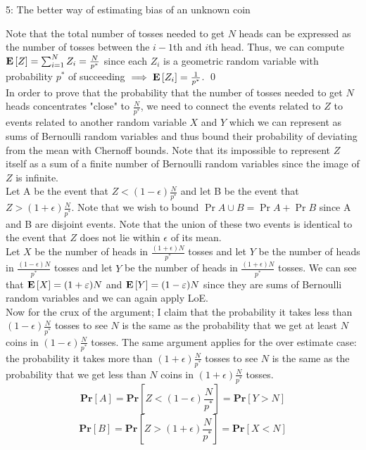 \documentclass[12pt]{article}
\begin{document}
\begin{solution}
\begin{problem}{5: The better way of estimating bias of an unknown coin}
\end{problem}
\begin{solution} 
Note that the total number of tosses needed to get $N$ heads can be expressed as the number of tosses between the $i-1$th and $i$th head. Thus, we can compute $\mathbf{E}\left[Z\right] = \sum_{i=1}^{N}{Z_i} = \frac{N}{p^*}$ since each $Z_i$ is a geometric random variable with probability $p^*$ of succeeding $\implies \mathbf{E}\left[Z_i\right] = \frac{1}{p^*}$. \qed \\
In order to prove that the probability that the number of tosses needed to get $N$ heads concentrates "close" to $\frac{N}{p^*}$, we need to connect the events related to $Z$ to events related to another random variable $X$ and $Y$ which we can represent as sums of Bernoulli random variables and thus bound their probability of deviating from the mean with Chernoff bounds. Note that its impossible to represent $Z$ itself as a sum of a finite number of Bernoulli random variables since the image of $Z$ is infinite. \\

Let A be the event that $Z < (1-\epsilon)\frac{N}{p^*}$ and let B be the event that $Z > (1+\epsilon)\frac{N}{p^*}$. Note that we wish to bound $\Pr{A\cup B} = \Pr{A} + \Pr{B}$ since A and B are disjoint events. Note that the union of these two events is identical to the event that $Z$ does not lie within $\epsilon$ of its mean.\\

Let $X$ be the number of heads in $\frac{(1+ \epsilon)N}{p^*}$ tosses and let $Y$ be the number of heads in $\frac{(1-\epsilon)N}{p^*}$ tosses and let $Y$ be the number of heads in $\frac{(1+ \epsilon)N}{p^*}$ tosses. We can see that $\mathbf{E}\left[X\right] = (1+\varepsilon)N$ and $\mathbf{E}\left[Y\right] = (1-\varepsilon)N$ since they are sums of Bernoulli random variables and we can again apply LoE.\\

Now for the crux of the argument; I claim that the probability it takes less than $(1-\epsilon)\frac{N}{p^*}$ tosses to see $N$ is the same as the probability that we get at least $N$ coins in $(1-\epsilon)\frac{N}{p^*}$ tosses. The same argument applies for the over estimate case: the probability it takes more than $(1+\epsilon)\frac{N}{p^*}$ tosses to see $N$ is the same as the probability that we get less than $N$ coins in $(1+\epsilon)\frac{N}{p^*}$ tosses.
\[
\textbf{Pr}[A] = \textbf{Pr}[Z < (1-\epsilon)\frac{N}{p^*}] = \textbf{Pr}[Y > N]
\]
\[
\textbf{Pr}[B] = \textbf{Pr}[Z > (1+\epsilon)\frac{N}{p^*}] = \textbf{Pr}[X <  N]
\]


\end{solution}
\end{solution}
\end{document}
